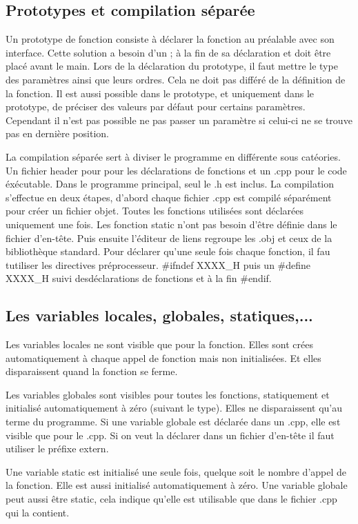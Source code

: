 \documentclass{article}
\begin{document}
\subsection{Prototypes et compilation séparée}
Un prototype de fonction consiste à déclarer la fonction au préalable avec son interface. Cette solution a besoin d'un \og ; \fg à la fin de  sa déclaration et doit être placé avant le main. Lors de la déclaration du prototype, il faut mettre le type des paramètres ainsi que leurs ordres. Cela ne doit pas différé de la définition de la fonction. Il est aussi possible dans le prototype, et uniquement dans le prototype, de préciser des valeurs par défaut pour certains paramètres. Cependant il n'est pas possible ne pas passer un paramètre si celui-ci ne se trouve pas en dernière position.

La compilation séparée sert à diviser le programme en différente sous catéories. Un fichier header pour pour les déclarations de fonctions et un .cpp pour le code éxécutable. Dans le programme principal, seul le .h est inclus.
La compilation s'effectue en deux étapes, d'abord chaque fichier .cpp est compilé séparément pour créer un fichier objet. Toutes les fonctions utilisées sont déclarées uniquement une fois. Les fonction static n'ont pas besoin d'être définie dans le fichier d'en-tête. Puis ensuite l'éditeur de liens regroupe les .obj et ceux de la bibliothèque standard. Pour déclarer qu'une seule fois chaque fonction, il fau tutiliser les directives préprocesseur. \#ifndef XXXX\_H puis un \#define XXXX\_H suivi desdéclarations de fonctions et à la fin \#endif. 
\subsection{Les variables locales, globales, statiques,...}
Les variables locales ne sont visible que pour la fonction. Elles sont crées automatiquement à chaque appel de fonction mais non initialisées. Et elles disparaissent quand la fonction se ferme. 

Les variables globales sont visibles pour toutes les fonctions, statiquement et initialisé automatiquement à zéro (suivant le type). Elles ne disparaissent qu'au terme du programme. Si une variable globale est déclarée dans un .cpp, elle est visible que pour le .cpp. Si on veut la déclarer dans un fichier d'en-tête il faut utiliser le préfixe extern. 

Une variable static est initialisé une seule fois, quelque soit le nombre d'appel de la fonction. Elle est aussi initialisé automatiquement à zéro. Une variable globale peut aussi être static, cela indique qu'elle est utilisable que dans le fichier .cpp qui la contient. 
\end{document}
